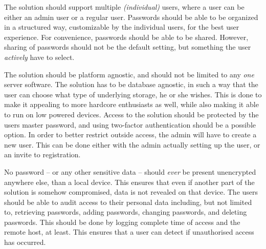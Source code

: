 			The solution should support multiple \emph{(individual)} users, where a user can be either an admin user or a regular user. Passwords should be able to be organized in a structured way, customizable by the individual users, for the best user experience. For convenience, passwords should be able to be shared. However, sharing of passwords should not be the default setting, but something the user \emph{actively} have to select.

			The solution should be platform agnostic, and should not be limited to any \emph{one} server software. The solution has to be database agnostic, in such a way that the user can choose what type of underlying storage, he or she wishes. This is done to make it appealing to more hardcore enthusiasts as well, while also making it able to run on low powered devices. Access to the solution should be protected by the users master password, and using two-factor authentication should be a possible option. In order to better restrict outside access, the admin will have to create a new user. This can be done either with the admin actually setting up the user, or an invite to registration.

			No password -- or any other sensitive data -- should \emph{ever} be present unencrypted anywhere else, than a local device. This ensures that even if another part of the solution is somehow compromised, data is not revealed on that device.  The users should be able to audit access to their personal data including, but not limited to, retrieving passwords, adding passwords, changing passwords, and deleting passwords. This should be done by logging complete time of access and the remote host, at least. This ensures that a user can detect if unauthorised access has occurred.


